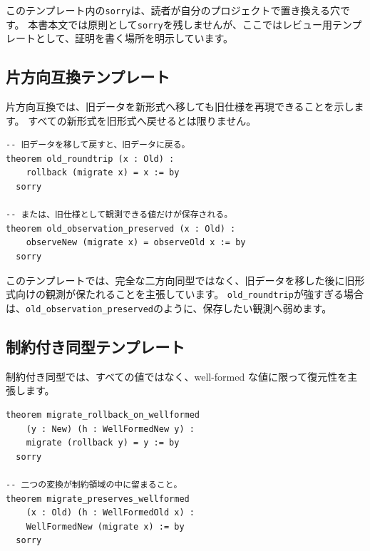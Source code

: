 このテンプレート内の\texttt{sorry}は、読者が自分のプロジェクトで置き換える穴です。
本書本文では原則として\texttt{sorry}を残しませんが、ここではレビュー用テンプレートとして、証明を書く場所を明示しています。

\subsection{片方向互換テンプレート}

片方向互換では、旧データを新形式へ移しても旧仕様を再現できることを示します。
すべての新形式を旧形式へ戻せるとは限りません。

\begin{listing}[htbp]
\begin{verbatim}
-- 旧データを移して戻すと、旧データに戻る。
theorem old_roundtrip (x : Old) :
    rollback (migrate x) = x := by
  sorry

-- または、旧仕様として観測できる値だけが保存される。
theorem old_observation_preserved (x : Old) :
    observeNew (migrate x) = observeOld x := by
  sorry
\end{verbatim}
\caption{\texttt{old\_roundtrip}・\texttt{old\_observation\_preserved}}
\label{lst:appD_template_one_way}
\end{listing}

このテンプレートでは、完全な二方向同型ではなく、旧データを移した後に旧形式向けの観測が保たれることを主張しています。
\texttt{old\_roundtrip}が強すぎる場合は、\texttt{old\_observation\_preserved}のように、保存したい観測へ弱めます。

\subsection{制約付き同型テンプレート}

制約付き同型では、すべての値ではなく、well-formed な値に限って復元性を主張します。

\begin{listing}[htbp]
\begin{verbatim}
theorem migrate_rollback_on_wellformed
    (y : New) (h : WellFormedNew y) :
    migrate (rollback y) = y := by
  sorry

-- 二つの変換が制約領域の中に留まること。
theorem migrate_preserves_wellformed
    (x : Old) (h : WellFormedOld x) :
    WellFormedNew (migrate x) := by
  sorry
\end{verbatim}
\caption{\texttt{migrate\_rollback\_on\_wellformed}・\texttt{migrate\_preserves\_wellformed}}
\label{lst:appD_template_wellformed}
\end{listing}

